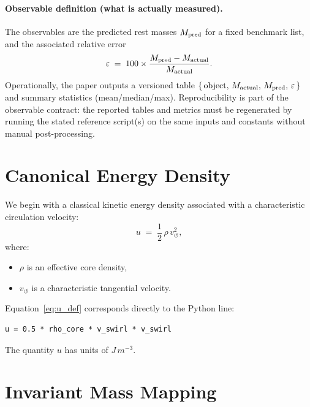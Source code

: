 \documentclass[11pt,a4paper]{article}
\begin{document}
\paragraph{Observable definition (what is actually measured).}
The observables are the predicted rest masses $M_{\rm pred}$ for a fixed benchmark list, and the associated relative error
\[
\varepsilon \;=\; 100 \times \frac{M_{\rm pred}-M_{\rm actual}}{M_{\rm actual}}.
\]
Operationally, the paper outputs a versioned table $\{\,\text{object},\,M_{\rm actual},\,M_{\rm pred},\,\varepsilon\,\}$ and summary statistics (mean/median/max). Reproducibility is part of the observable contract: the reported tables and metrics must be regenerated by running the stated reference script(s) on the same inputs and constants without manual post-processing.

    \section{Canonical Energy Density}

        We begin with a classical kinetic energy density associated with a
        characteristic circulation velocity:
        \begin{equation}
            u \;=\; \frac{1}{2}\,\rho\,v_{\circlearrowleft}^2 ,
            \label{eq:u_def}
        \end{equation}
        where:
        \begin{itemize}
            \item $\rho$ is an effective core density,
            \item $v_{\circlearrowleft}$ is a characteristic tangential velocity.
        \end{itemize}

        Equation~\eqref{eq:u_def} corresponds directly to the Python line:
        \begin{verbatim}
u = 0.5 * rho_core * v_swirl * v_swirl
        \end{verbatim}

        The quantity $u$ has units of $\si{J\,m^{-3}}$.

    \section{Invariant Mass Mapping}
\end{document}
